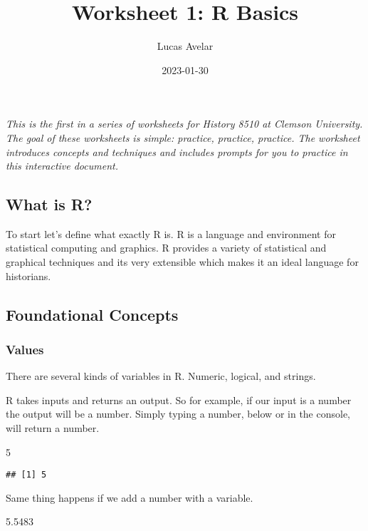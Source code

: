 \documentclass[
]{article}
\title{Worksheet 1: R Basics}
\author{Lucas Avelar}
\date{2023-01-30}
\newenvironment{Shaded}{\begin{snugshade}}{\end{snugshade}}
\newcommand{\DecValTok}[1]{\textcolor[rgb]{0.00,0.00,0.81}{#1}}
\newcommand{\FloatTok}[1]{\textcolor[rgb]{0.00,0.00,0.81}{#1}}
\begin{document}
\maketitle

\emph{This is the first in a series of worksheets for History 8510 at
Clemson University. The goal of these worksheets is simple: practice,
practice, practice. The worksheet introduces concepts and techniques and
includes prompts for you to practice in this interactive document.}

\hypertarget{what-is-r}{%
\subsection{What is R?}\label{what-is-r}}

To start let's define what exactly R is. R is a language and environment
for statistical computing and graphics. R provides a variety of
statistical and graphical techniques and its very extensible which makes
it an ideal language for historians.

\hypertarget{foundational-concepts}{%
\subsection{Foundational Concepts}\label{foundational-concepts}}

\hypertarget{values}{%
\subsubsection{Values}\label{values}}

There are several kinds of variables in R. Numeric, logical, and
strings.

R takes inputs and returns an output. So for example, if our input is a
number the output will be a number. Simply typing a number, below or in
the console, will return a number.

\begin{Shaded}
\begin{Highlighting}[]
\DecValTok{5}
\end{Highlighting}
\end{Shaded}

\begin{verbatim}
## [1] 5
\end{verbatim}

Same thing happens if we add a number with a variable.

\begin{Shaded}
\begin{Highlighting}[]
\FloatTok{5.5483}
\end{Highlighting}
\end{Shaded}
\end{document}
